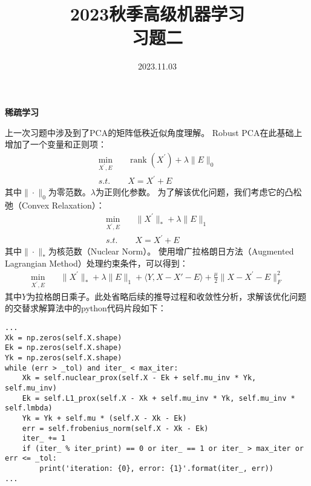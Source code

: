 \documentclass[answers]{exam}  %
\title{2023秋季高级机器学习 \\ 习题二}
\date{2023.11.03}
\begin{document}
\maketitle

\begin{questions}

\question [30] \textbf{稀疏学习}

上一次习题中涉及到了PCA的矩阵低秩近似角度理解。
Robust PCA在此基础上增加了一个变量和正则项：
\begin{align}
    \min_{X^{\prime},E} \quad & \operatorname{rank}(X^{\prime})+\lambda\|E\|_0 \\
    s.t.\quad & X = X^\prime + E \nonumber
\end{align}
其中$\|\cdot\|_0$为零范数。$\lambda$为正则化参数。
为了解该优化问题，我们考虑它的凸松弛（Convex Relaxation）：
\begin{align}
    \min_{X^{\prime},E} \quad & \|X^\prime\|_*+\lambda\|E\|_1 \\
    s.t.\quad & X = X^\prime + E \nonumber
\end{align}
其中$\|\cdot\|_*$为核范数（Nuclear Norm）。
使用增广拉格朗日方法（Augmented Lagrangian Method）处理约束条件，可以得到：
\begin{align}
    \min_{X^{\prime},E} \quad & \|X^\prime\|_*+\lambda\|E\|_1 + \langle Y, X - X' - E\rangle + \frac{\mu}{2}\|X-X^\prime-E\|^2_F
\end{align}
其中$Y$为拉格朗日乘子。此处省略后续的推导过程和收敛性分析，求解该优化问题的交替求解算法中的python代码片段如下：
\begin{lstlisting}
...
Xk = np.zeros(self.X.shape)
Ek = np.zeros(self.X.shape)
Yk = np.zeros(self.X.shape)
while (err > _tol) and iter_ < max_iter:
    Xk = self.nuclear_prox(self.X - Ek + self.mu_inv * Yk, self.mu_inv)
    Ek = self.L1_prox(self.X - Xk + self.mu_inv * Yk, self.mu_inv * self.lmbda)
    Yk = Yk + self.mu * (self.X - Xk - Ek)
    err = self.frobenius_norm(self.X - Xk - Ek)
    iter_ += 1
    if (iter_ % iter_print) == 0 or iter_ == 1 or iter_ > max_iter or err <= _tol:
        print('iteration: {0}, error: {1}'.format(iter_, err))
...
\end{lstlisting}

\end{questions}
\end{document}
